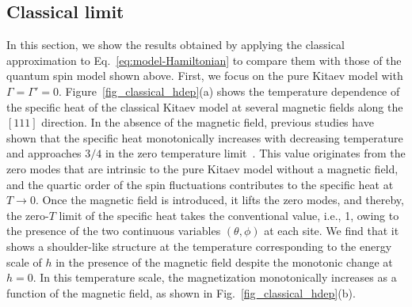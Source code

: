 \documentclass[twocolumn,superscriptaddress,showpacs, longbibliography, aps, prb]{revtex4-2}
\newcommand{\orange}[1]{\textcolor{orange}{#1}}
\begin{document}
 \subsection{Classical limit}
\label{sec:classicalMC}

In this section, we show the results obtained by applying the classical approximation %
to Eq.~\eqref{eq:model-Hamiltonian} to compare %
them with those of %
the quantum spin model shown above.
First, we focus on the pure Kitaev model with $\Gamma=\Gamma'=0$.
Figure~\ref{fig_classical_hdep}(a) shows the temperature dependence of the specific heat of the classical Kitaev model at several magnetic fields along the $[111]$ direction.
In the absence of the magnetic field, %
previous studies %
have shown that the specific heat monotonically increases with decreasing temperature and approaches $3/4$ in the zero temperature limit~\cite{Sela2014,Suzuki2018_2}.
This value originates from the zero modes that are intrinsic to the pure Kitaev model without a magnetic field, and the quartic order of the spin fluctuations contributes to the specific heat at $T\to 0$.
Once the magnetic field is introduced, it lifts the zero modes, and thereby, the zero-$T$ limit of the specific heat takes the conventional value, i.e., 1, owing to the presence of the two continuous variables $(\theta,\phi)$ at each site.
We find that it shows a shoulder-like structure %
at the temperature corresponding to the energy scale of $h$ in the presence of the magnetic field despite the monotonic change at $h=0$.
In this temperature scale, the magnetization monotonically increases as a function of the magnetic field,
as shown in Fig.~\ref{fig_classical_hdep}(b).
\end{document}
